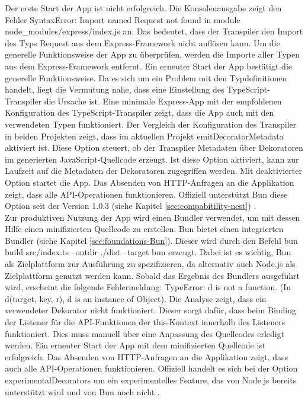 \noindent
Der erste Start der App ist nicht erfolgreich. Die Konsolenausgabe zeigt den Fehler \glq SyntaxError: Import named Request not found in module node\_modules/express/index.js\grq{} an. Das bedeutet, dass der Transpiler den Import des Typs \glq Request\grq{} aus dem Express-Framework nicht auflösen kann. Um die generelle Funktionsweise der App zu überprüfen, werden die Importe aller Typen aus dem Express-Framework entfernt. Ein erneuter Start der App bestätigt die generelle Funktionsweise. Da es sich um ein Problem mit den Typdefinitionen handelt, liegt die Vermutung nahe, dass eine Einstellung des TypeScript-Transpiler die Ursache ist. Eine minimale Express-App mit der empfohlenen Konfiguration des TypeScript-Transpiler zeigt, dass die App auch mit den verwendeten Typen funktioniert. Der Vergleich der Konfiguration des Transpiler in beiden Projekten zeigt, dass im aktuellen Projekt \glq emitDecoratorMetadata\grq{} aktiviert ist. Diese Option steuert, ob der Transpiler Metadaten über Dekoratoren im generierten JavaScript-Quellcode erzeugt. Ist diese Option aktiviert, kann zur Laufzeit auf die Metadaten der Dekoratoren zugegriffen werden. Mit deaktivierter Option startet die App. Das Absenden von HTTP-Anfragen an die Applikation zeigt, dass alle API-Operationen funktionieren. Offiziell unterstützt Bun diese Option seit der Version 1.0.3 (siehe Kapitel \ref{sec:compabitility-nest}) \cite{McDonnel.2023}.\\

\noindent
Zur produktiven Nutzung der App wird einen Bundler verwendet, um mit dessen Hilfe einen minifizierten Quellcode zu erstellen. Bun bietet einen integrierten Bundler (siehe Kapitel \ref{sec:foundations-Bun}). Dieser wird durch den Befehl \glq bun build src/index.ts --outdir ./dist --target bun\grq{} erzeugt. Dabei ist es wichtig, Bun als Zielplattform zur Ausführung zu spezifizieren, da alternativ auch Node.js als Zielplattform genutzt werden kann. Sobald das Ergebnis des Bundlers ausgeführt wird, erscheint die folgende Fehlermeldung: \glq TypeError: d is not a function. (In d(target, key, r), d is an instance of Object)\grq{}. Die Analyse zeigt, dass ein verwendeter Dekorator nicht funktioniert. Dieser sorgt dafür, dass beim Binding der Listener für die API-Funktionen der this-Kontext innerhalb des Listeners funktioniert. Dies muss manuell über eine Anpassung des Quellcodes erledigt werden. Ein erneuter Start der App mit dem minifizierten Quellcode ist erfolgreich. Das Absenden von HTTP-Anfragen an die Applikation zeigt, dass auch alle API-Operationen funktionieren. Offiziell handelt es sich bei der Option \glq experimentalDecorators\grq{} um ein experimentelles Feature, das von Node.js bereits unterstützt wird und von Bun noch nicht \cite{Microsoft.2023}.

